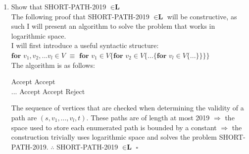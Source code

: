 \documentclass[12pt]{article}
\begin{document}
\begin{enumerate}
\begin{enumerate}
\item Show that SHORT-PATH-2019 $\in \textbf{L}$ \\
The following proof that SHORT-PATH-2019 $\in  \textbf{L} $ will be constructive, as such I will present an algorithm to solve the problem that works in logarithmic space.\\
I will first introduce a useful syntactic structure:\\
$\textbf{for}$ $v_1,v_2,...v_l \in V$ $\equiv $ $\textbf{for}$ $v_1 \in V \{ \textbf{for}$ $v_2 \in V \{ ... \{\textbf{for}$ $v_l \in V \{...\}\}\}\} $\\
The algorithm is as follows:
\begin{algorithmic}
		\STATE Accept
	\ENDIF
\ENDFOR
{}
		\STATE Accept
	\ENDIF
\ENDFOR\\
...
		\STATE Accept
	\ENDIF
\ENDFOR
{}
		\STATE Accept
	\ENDIF
\ENDFOR
\STATE Reject
\end{algorithmic}
The sequence of vertices that are checked when determining the validity of a path are $(s,v_1,...,v_l,t)$. These paths are of length at most 2019 $\Rightarrow $ the space used to store each enumerated path is bounded by a constant $\Rightarrow $ the construction trivially uses logarithmic space and solves the problem SHORT-PATH-2019.
$\therefore $ SHORT-PATH-2019 $\in \textbf{L}$ $\square$


\end{enumerate}
\end{enumerate}
\end{document}
